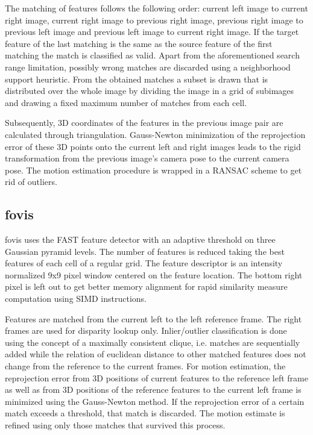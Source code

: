 \documentclass[conference]{IEEEtran}
\begin{document}
The matching of features follows the following order: current left image to current right image, current right image to previous right image, previous right image to previous left image and previous left image to current right image. If the target feature of the last matching is the same as the source feature of the first matching the match is classified as valid. Apart from the aforementioned search range limitation, possibly wrong matches are discarded using a neighborhood support heuristic.
From the obtained matches a subset is drawn that is distributed over the whole image by dividing the image in a grid of subimages and drawing a fixed maximum number of matches from each cell.

Subsequently, 3D coordinates of the features in the previous image pair are calculated through triangulation. Gauss-Newton minimization of the reprojection error of these 3D points onto the current left and right images leads to the rigid transformation from the previous image's camera pose to the current camera pose. The motion estimation procedure is wrapped in a RANSAC \cite{Fischler1981} scheme to get rid of outliers.


\subsection{fovis
  \label{fovis}
}

fovis uses the FAST feature detector \cite{Rosten2005FPA,Rosten2006} with an adaptive threshold on three Gaussian pyramid levels. The number of features is reduced taking the best features of each cell of a regular grid. The feature descriptor is an intensity normalized 9x9 pixel window centered on the feature location. The bottom right pixel is left out to get better memory alignment for rapid similarity measure computation using SIMD instructions.

Features are matched from the current left to the left reference frame. The right frames are used for disparity lookup only. Inlier/outlier classification is done using the concept of a maximally consistent clique, i.e. matches are sequentially added while the relation of euclidean distance to other matched features does not change from the reference to the current frames. For motion estimation, the reprojection error from 3D positions of current features to the reference left frame as well as from 3D positions of the reference features to the current left frame is minimized using the Gauss-Newton method. If the reprojection error of a certain match exceeds a threshold, that match is discarded. The motion estimate is refined using only those matches that survived this process.
\end{document}

